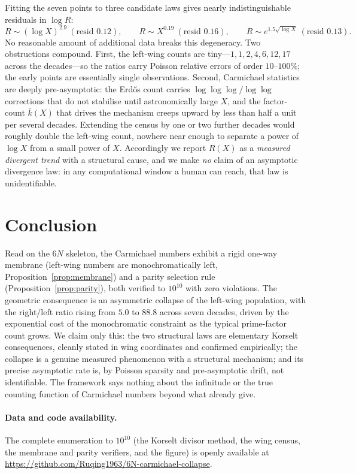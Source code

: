 \documentclass[11pt]{article}
\theoremstyle{plain}
\theoremstyle{definition}
\begin{document}
Fitting the seven points to three candidate laws gives nearly indistinguishable residuals in
$\log R$:
\[
R\sim(\log X)^{2.9}\ (\text{resid }0.12),\qquad
R\sim X^{0.19}\ (\text{resid }0.16),\qquad
R\sim e^{1.5\sqrt{\log X}}\ (\text{resid }0.13).
\]
No reasonable amount of additional data breaks this degeneracy. Two obstructions compound. First, the
left-wing counts are tiny---$1,1,2,4,6,12,17$ across the decades---so the ratios carry Poisson
relative errors of order $10\text{--}100\%$; the early points are essentially single observations.
Second, Carmichael statistics are deeply pre-asymptotic: the Erd\H{o}s count carries
$\log\log\log/\log\log$ corrections that do not stabilise until astronomically large $X$, and the
factor-count $\bar k(X)$ that drives the mechanism creeps upward by less than half a unit per several
decades. Extending the census by one or two further decades would roughly double the left-wing count,
nowhere near enough to separate a power of $\log X$ from a small power of $X$. Accordingly we report
$R(X)$ as a \emph{measured divergent trend} with a structural cause, and we make \emph{no} claim of an
asymptotic divergence law: in any computational window a human can reach, that law is unidentifiable.

\section{Conclusion}
Read on the $6N$ skeleton, the Carmichael numbers exhibit a rigid one-way membrane (left-wing numbers
are monochromatically left, Proposition~\ref{prop:membrane}) and a parity selection rule
(Proposition~\ref{prop:parity}), both verified to $10^{10}$ with zero violations. The geometric
consequence is an asymmetric collapse of the left-wing population, with the right/left ratio rising
from $5.0$ to $88.8$ across seven decades, driven by the exponential cost of the monochromatic
constraint as the typical prime-factor count grows. We claim only this: the two structural laws are
elementary Korselt consequences, cleanly stated in wing coordinates and confirmed empirically; the
collapse is a genuine measured phenomenon with a structural mechanism; and its precise asymptotic rate
is, by Poisson sparsity and pre-asymptotic drift, not identifiable. The framework says nothing about
the infinitude or the true counting function of Carmichael numbers beyond what \cite{AGP,Erdos,Pinch}
already give.

\paragraph{Data and code availability.}
The complete enumeration to $10^{10}$ (the Korselt divisor method, the wing census, the membrane and
parity verifiers, and the figure) is openly available at
\url{https://github.com/Ruqing1963/6N-carmichael-collapse}.
\end{document}
